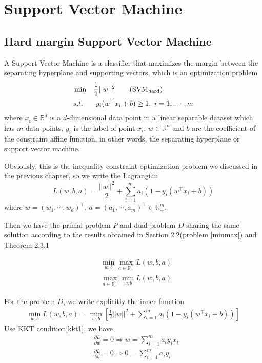 \documentclass[a4paper]{report}
\begin{document}
\chapter{Support Vector Machine}
\section{Hard margin Support Vector Machine}

A Support Vector Machine is a classifier that maximizes the margin between the separating hyperplane and supporting vectors\cite{cortes1995support}, which is an optimization problem 
\begin{align*}
    &\min& & \frac{1}{2}||w||^2 \label{svmhard}\tag{$\mathrm{SVM_{hard}}$}\\
    &s.t.& & \ y_i(w^\top x_i+b)\geq 1, \ i=1,\cdots,m
\end{align*}
where $x_i\in \mathbb R^d$ is a $d$-dimensional data point in a linear separable dataset which has $m$ data points, $y_i$ is the label of point $x_i$. $w\in \mathbb R^n$ and $b$ are the coefficient of the constraint affine function, in other words, the separating hyperplane or support vector machine. 

Obviously, this is the inequality constraint optimization problem we discussed in the previous chapter, so we write the Lagrangian
\[
    L(w,b,a)=\frac{||w||^2}{2}+\sum_{i=1}^m a_i(1-y_i(w^\top x_i+b))
\]
where $w=(w_1,\cdots,w_d)^\top$, $a=(a_1,\cdots,a_m)^\top\in\mathbb R_+^m$.

Then we have the primal problem $P$ and dual problem $D$ sharing the same solution according to the results obtained in Section 2.2(problem \ref{minmax}) and Theorem 2.3.1

\begin{align}
    &\min_{w,b} \max_{a\in\mathbb R_+^m} L(w,b,a) \tag{P}\\
    &\max_{a\in\mathbb R_+^m} \min_{w,b} L(w,b,a) \tag{D}
\end{align}

For the problem $D$, we write explicitly the inner function
\begin{align}
    \min_{w,b} L(w,b,a)=\min_{w,b}[\frac{1}{2}||w||^2+\sum_{i=1}^m a_i(1-y_i(w^\top x_i+b))]
\end{align}
Use KKT condition\ref{kkt1}, we have
\begin{align}
    &\frac{\partial L}{\partial w}=0\Rightarrow w=\sum_{i=1}^m a_i y_i x_i\\
    &\frac{\partial L}{\partial b}=0\Rightarrow 0=\sum_{i=1}^m a_i y_i
\end{align}
\end{document}
